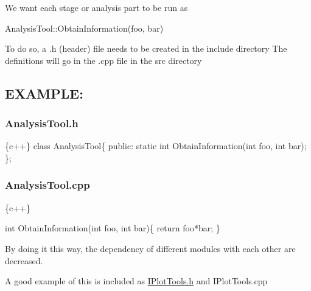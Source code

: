 We want each stage or analysis part to be run as

Analysis\+Tool\+::\+Obtain\+Information(foo, bar)

To do so, a .h (header) file needs to be created in the include directory The definitions will go in the .cpp file in the src directory

\subsection*{E\+X\+A\+M\+P\+LE\+:}

\subsubsection*{Analysis\+Tool.\+h}


\begin{DoxyCode}
\{c++\}
        class AnalysisTool\{
            public:
                static int ObtainInformation(int foo, int bar);
        \};
\end{DoxyCode}


\subsubsection*{Analysis\+Tool.\+cpp}


\begin{DoxyCode}
\{c++\}

        int ObtainInformation(int foo, int bar)\{
            return foo*bar;
        \}
\end{DoxyCode}


By doing it this way, the dependency of different modules with each other are decreased.

A good example of this is included as \hyperlink{IPlotTools_8h_source}{I\+Plot\+Tools.\+h} and I\+Plot\+Tools.\+cpp 